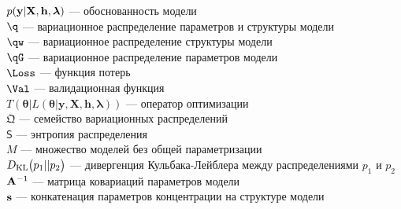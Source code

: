 $p(\mathbf{y}|\mathbf{X}, \mathbf{h},\boldsymbol{\lambda})$ --- обоснованность модели\\
$\q$ --- вариационное распределение параметров и структуры модели\\
$\qw$ --- вариационное распределение структуры модели\\
$\qG$ --- вариационное распределение параметров модели\\
$\Loss$ --- функция потерь\\
$\Val$ --- валидационная функция\\
$T(\boldsymbol{\theta} |L(\boldsymbol{\theta} |\mathbf{y},\mathbf{X},\mathbf{h},\boldsymbol{\lambda}))$ --- оператор оптимизации\\
$\mathfrak{Q}$ --- семейство вариационных распределений\\
$\mathsf{S}$ --- энтропия распределения\\
$M$ --- множество моделей без общей параметризации\\
$D_\text{KL}\bigl(p_1 || p_2\bigr)$ --- дивергенция Кульбака-Лейблера  между распределениями $p_1$ и $p_2$
$\mathbf{A}^{-1}$ --- матрица ковариаций параметров модели\\
$\mathbf{s}$ --- конкатенация параметров концентрации на структуре модели
